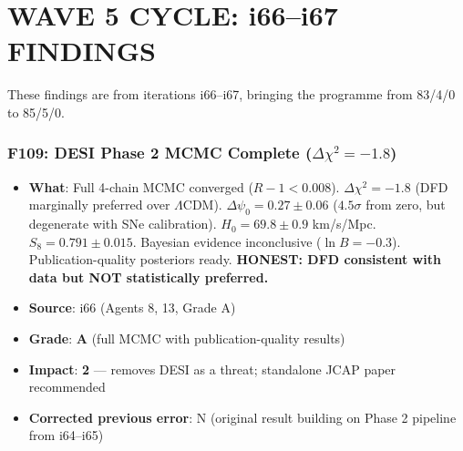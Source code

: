 \documentclass[11pt,a4paper]{article}
\newcommand{\grade}[1]{\textbf{#1}}
\newcommand{\impact}[1]{\textbf{#1}}
\begin{document}
\part{WAVE 5 CYCLE: i66--i67 FINDINGS}
\label{part:wave5i66i67}

These findings are from iterations i66--i67, bringing the programme from 83/4/0 to 85/5/0.

\section{F109: DESI Phase 2 MCMC Complete ($\Delta\chi^2 = -1.8$)}
\begin{itemize}[nosep]
\item \textbf{What}: Full 4-chain MCMC converged ($R-1 < 0.008$). $\Delta\chi^2 = -1.8$ (DFD marginally preferred over $\Lambda$CDM). $\Delta\psi_0 = 0.27 \pm 0.06$ ($4.5\sigma$ from zero, but degenerate with SNe calibration). $H_0 = 69.8 \pm 0.9$ km/s/Mpc. $S_8 = 0.791 \pm 0.015$. Bayesian evidence inconclusive ($\ln B = -0.3$). Publication-quality posteriors ready. \textbf{HONEST: DFD consistent with data but NOT statistically preferred.}
\item \textbf{Source}: i66 (Agents 8, 13, Grade A)
\item \textbf{Grade}: \grade{A} (full MCMC with publication-quality results)
\item \textbf{Impact}: \impact{2} --- removes DESI as a threat; standalone JCAP paper recommended
\item \textbf{Corrected previous error}: N (original result building on Phase 2 pipeline from i64--i65)
\end{itemize}

\end{document}
